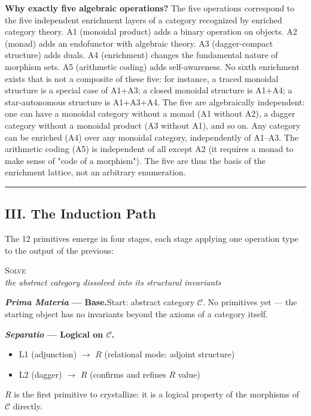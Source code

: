 \documentclass[12pt,a4paper]{article}
\begin{document}
\textbf{Why exactly five algebraic operations?} The five operations correspond to the five independent enrichment layers of a category recognized by enriched category theory. A1 (monoidal product) adds a binary operation on objects. A2 (monad) adds an endofunctor with algebraic theory. A3 (dagger-compact structure) adds duals. A4 (enrichment) changes the fundamental nature of morphism sets. A5 (arithmetic coding) adds self-awareness. No sixth enrichment exists that is not a composite of these five: for instance, a traced monoidal structure is a special case of A1+A3; a closed monoidal structure is A1+A4; a star-autonomous structure is A1+A3+A4. The five are algebraically independent: one can have a monoidal category without a monad (A1 without A2), a dagger category without a monoidal product (A3 without A1), and so on. Any category can be enriched (A4) over any monoidal category, independently of A1--A3. The arithmetic coding (A5) is independent of all except A2 (it requires a monad to make sense of "code of a morphism"). The five are thus the basis of the enrichment lattice, not an arbitrary enumeration.

\begin{center}
\rule{0.5\textwidth}{0.4pt}
\end{center}

\subsection{III. The Induction Path}
The 12 primitives emerge in four stages, each stage applying one operation type to the output of the previous:

\begin{center}
\vspace{0.6em}
{\large\textsc{Solve}}\\[4pt]
{\small\itshape the abstract category dissolved into its structural invariants}
\vspace{0.4em}
\end{center}

\noindent\textbf{\emph{Prima Materia} --- Base.}\quad Start: abstract category $\mathcal{C}$. No primitives yet --- the starting object has no invariants beyond the axioms of a category itself.

\medskip

\noindent\textbf{\emph{Separatio} --- Logical on $\mathcal{C}$.}
\begin{itemize}[nosep, leftmargin=2em]
\item L1 (adjunction) $\to$ $R$ (relational mode: adjoint structure)
\item L2 (dagger) $\to$ $R$ (confirms and refines $R$ value)
\end{itemize}
$R$ is the first primitive to crystallize: it is a logical property of the morphisms of $\mathcal{C}$ directly.
\end{document}
